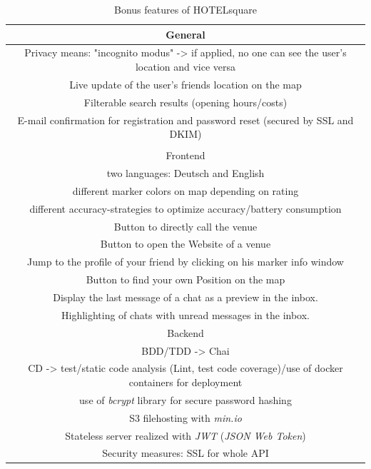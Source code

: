 \begin{table}[htbp]
	\centering
	\label{tab:bonus_features}
	\begin{tabular}{c}
		General \\
		\hline\hline
		Privacy means: "incognito modus" 
		-> if applied, no one can see the user's location and vice versa \\
		\hline
		Live update of the user's friends location on the map \\
		\hline
		Filterable search results (opening hours/costs) \\
		\hline
		E-mail confirmation for registration and password reset (secured by SSL and DKIM) \\
		\hline
		\\
		\hline\hline
		Frontend \\
		\hline\hline
		two languages: Deutsch and English  \\
		\hline
		different marker colors on map depending on rating \\
		\hline
		different accuracy-strategies to optimize accuracy/battery consumption \\
		\hline
		Button to directly call the venue \\
		\hline
		Button to open the Website of a venue \\
		\hline
		Jump to the profile of your friend by clicking on his marker info window \\
		\hline
		Button to find your own Position on the map \\
		\hline
		Display the last message of a chat as a preview in the inbox.  \\
		\hline
		Highlighting of chats with unread messages in the inbox. \\
		\hline\hline
		Backend \\
		\hline\hline
		BDD/TDD -> Chai \\
		\hline
		CD -> test/static code analysis (Lint, test code coverage)/use of docker containers for deployment \\
		\hline
		use of \textit{bcrypt} library for secure password hashing \\
		\hline
		S3 filehosting with \textit{min.io} \\
		\hline
		Stateless server realized with \textit{JWT} (\textit{JSON Web Token}) \\
		\hline
		Security measures: SSL for whole API \\
	\end{tabular}
\caption{Bonus features of HOTELsquare}
\end{table}




